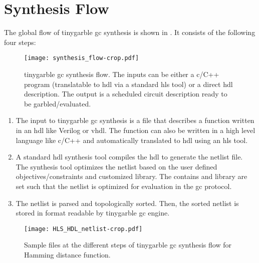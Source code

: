\section{Synthesis Flow}\label{sec:syn-flow}
The global flow of \gls{tinygarble} \acrshort{gc} synthesis is shown in .
It consists of the following four steps:

\begin{figure}[ht]
\centering
\texttt{[image: synthesis\_flow-crop.pdf]}
\caption{\gls{tinygarble} \acrshort{gc} synthesis flow.
  The inputs can be either a \gls{c}/C++ program (translatable to \acrshort{hdl} via a standard \acrshort{hls} tool) or a direct \acrshort{hdl} description.
  The output is a scheduled circuit description ready to be garbled/evaluated.}
\label{fig:synthesis-flow}
\end{figure}

\begin{enumerate}
\item The input to \gls{tinygarble} \acrshort{gc} synthesis is a file that describes a function written in an \acrshort{hdl} like Verilog or \gls{vhdl}.
      The function can also be written in a high level language like \gls{c}/C++ and automatically translated to \acrshort{hdl} using an \acrshort{hls} tool.

\item A standard \acrshort{hdl} synthesis tool compiles the \acrshort{hdl} to generate the netlist file.
      The synthesis tool optimizes the netlist based on the user defined objectives/constraints and customized library.
      The contains and library are set such that the netlist is optimized for evaluation in the \acrshort{gc} protocol.

\item The netlist is parsed and topologically sorted.
      Then, the sorted netlist is stored in format readable by \gls{tinygarble} \acrshort{gc} engine.
\end{enumerate}

\begin{figure}[ht]
\centering
\texttt{[image: HLS\_HDL\_netlist-crop.pdf]}
\caption{Sample files at the different steps of \gls{tinygarble} \acrshort{gc} synthesis flow for Hamming distance function.}
\label{fig:globalflow_sample}
\end{figure}

